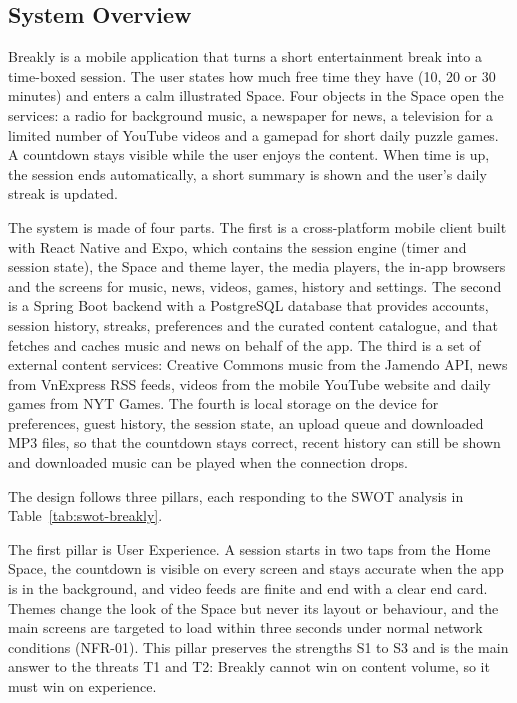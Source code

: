 \subsection{System Overview}
\label{sec:system-overview}

Breakly is a mobile application that turns a short entertainment break into
a time-boxed session. The user states how much free time they have (10, 20
or 30 minutes) and enters a calm illustrated Space. Four objects in the
Space open the services: a radio for background music, a newspaper for news,
a television for a limited number of YouTube videos and a gamepad for short
daily puzzle games. A countdown stays visible while the user enjoys the
content. When time is up, the session ends automatically, a short summary is
shown and the user's daily streak is updated.

The system is made of four parts. The first is a cross-platform mobile client
built with React Native and Expo, which contains the session engine (timer
and session state), the Space and theme layer, the media players, the in-app
browsers and the screens for music, news, videos, games, history and
settings. The second is a Spring Boot backend with a PostgreSQL database that
provides accounts, session history, streaks, preferences and the curated
content catalogue, and that fetches and caches music and news on behalf of the
app. The third is a set of external content services: Creative Commons music
from the Jamendo API, news from VnExpress RSS feeds, videos from the mobile
YouTube website and daily games from NYT Games. The fourth is local storage on
the device for preferences, guest history, the session state, an upload queue
and downloaded MP3 files, so that the countdown stays correct, recent history
can still be shown and downloaded music can be played when the connection
drops.

The design follows three pillars, each responding to the SWOT analysis in
Table~\ref{tab:swot-breakly}.

The first pillar is User Experience. A session starts in two taps from the
Home Space, the countdown is visible on every screen and stays accurate when
the app is in the background, and video feeds are finite and end with a clear
end card. Themes change the look of the Space but never its layout or
behaviour, and the main screens are targeted to load within three seconds
under normal network conditions (NFR-01). This pillar preserves the strengths S1 to S3
and is the main answer to the threats T1 and T2: Breakly cannot win on
content volume, so it must win on experience.

